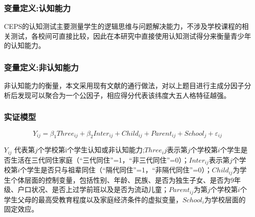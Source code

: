 \documentclass{beamer}
\begin{document}
\begin{frame}
	\frametitle{变量定义:认知能力}
CEPS的认知测试主要测量学生的逻辑思维与问题解决能力，不涉及学校课程的相关测试，各校间可直接比较，因此在本研究中直接使用认知测试得分来衡量青少年的认知能力。
\end{frame}


\begin{frame}
	\frametitle{变量定义:非认知能力}
\begin{table}[!htbp]
\caption{非认知能力的度量}
\label{nocog_scale}
\end{table}
非认知能力的衡量，本文采用现有文献的通行做法，对以上题目进行主成分因子分析后发现可以聚合为一个公因子，相应得分代表该纬度大五人格特征越强。
\end{frame}


\begin{frame}
	\frametitle{实证模型}
\begin{equation}
	Y_{ij}=\beta_1Three_{ij}+\beta_2Inter_{ij}+Child_{ij}+Parent_{ij}+School_j+\varepsilon_{ij}
\end{equation}

$Y_{ij}$ 代表第$j$个学校第i个学生认知或非认知能力;$Three_ij$表示第$j$个学校第$i$个学生是否生活在三代同住家庭（“三代同住”=1，“非三代同住”=0）；$Inter_{ij}$表示第$j$个学校第$i$个学生是否只与祖辈同住（“隔代同住”=1，“非隔代同住”=0）；$Child_{ij}$为学生个体层面的控制变量，包括性别、年龄、民族、是否为独生子女、是否为9年级、户口状况、是否上过学前班以及是否为流动儿童；$Parent_{ij}$为第$j$个学校第$i$个学生父母的最高受教育程度以及家庭经济条件的虚拟变量，$School_i$为学校层面的固定效应。
\end{frame}
\end{document}
